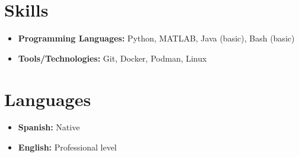 \documentclass[letterpaper,10pt]{article}
\begin{document}
\section*{Skills}
\vspace{5pt}
\color{textgray}
\begin{itemize}
    \item \textbf{Programming Languages:} Python, MATLAB, Java (basic), Bash (basic)
    \item \textbf{Tools/Technologies:} Git, Docker, Podman, Linux
\end{itemize}

\section*{Languages}
\vspace{5pt}
\color{textgray}
\begin{itemize}
    \item \textbf{Spanish:} Native
    \item \textbf{English:} Professional level
\end{itemize}
\end{document}
